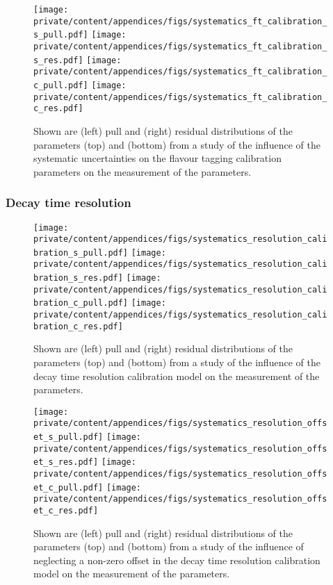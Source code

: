 \begin{figure}[h]
  \texttt{[image: private/content/appendices/figs/systematics\_ft\_calibration\_s\_pull.pdf]}\hfill
  \texttt{[image: private/content/appendices/figs/systematics\_ft\_calibration\_s\_res.pdf]}
  \texttt{[image: private/content/appendices/figs/systematics\_ft\_calibration\_c\_pull.pdf]}\hfill
  \texttt{[image: private/content/appendices/figs/systematics\_ft\_calibration\_c\_res.pdf]}
\caption{Shown are (left) pull and (right) residual distributions of the
parameters (top) \SJpsiKS and (bottom) \CJpsiKS from a \ToyMC study of the
influence of the systematic uncertainties on the flavour tagging calibration
parameters on the measurement of the \CP parameters.}
\label{fig:app:measurement_of_sin2beta:systematics:systematics:tagging}
\end{figure}

\FloatBarrier
\subsubsection{Decay time resolution}
\label{sec:app:measurement_of_sin2beta:systematics:systematics:resolution}

\begin{figure}[h]
  \texttt{[image: private/content/appendices/figs/systematics\_resolution\_calibration\_s\_pull.pdf]}\hfill
  \texttt{[image: private/content/appendices/figs/systematics\_resolution\_calibration\_s\_res.pdf]}
  \texttt{[image: private/content/appendices/figs/systematics\_resolution\_calibration\_c\_pull.pdf]}\hfill
  \texttt{[image: private/content/appendices/figs/systematics\_resolution\_calibration\_c\_res.pdf]}
\caption{Shown are (left) pull and (right) residual distributions of the
parameters (top) \SJpsiKS and (bottom) \CJpsiKS from a \ToyMC study of the
influence of the decay time resolution calibration model on the measurement of
the \CP parameters.}
\label{fig:app:measurement_of_sin2beta:systematics:systematics:resolution:calibration}
\end{figure}

\begin{figure}[h]
  \texttt{[image: private/content/appendices/figs/systematics\_resolution\_offset\_s\_pull.pdf]}\hfill
  \texttt{[image: private/content/appendices/figs/systematics\_resolution\_offset\_s\_res.pdf]}
  \texttt{[image: private/content/appendices/figs/systematics\_resolution\_offset\_c\_pull.pdf]}\hfill
  \texttt{[image: private/content/appendices/figs/systematics\_resolution\_offset\_c\_res.pdf]}
\caption{Shown are (left) pull and (right) residual distributions of the
parameters (top) \SJpsiKS and (bottom) \CJpsiKS from a \ToyMC study of the
influence of neglecting a non-zero offset in the decay time resolution
calibration model on the measurement of the \CP parameters.}
\label{fig:app:measurement_of_sin2beta:systematics:systematics:resolution:offset}
\end{figure}

